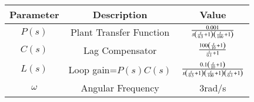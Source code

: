 \begin{tabular}{|c|c|c|}
\hline
    Parameter & Description & Value\\
    \hline
    $P(s)$ & Plant Transfer Function & $\frac{0.001}{s\left(\frac{s}{0.5}+1\right)\left(\frac{s}{100}+1\right)}$\\
    \hline
    $C(s)$ & Lag Compensator  & $\frac{100\left(\frac{s}{10}+1\right)}{\frac{s}{0.1}+1}$\\
    \hline
    $L(s)$ & Loop gain=$P(s) C(s)$  & $\frac{0.1\left(\frac{s}{10}+1\right)}{s\left(\frac{s}{0.5}+1\right)\left(\frac{s}{100}+1\right)\left(\frac{s}{0.1}+1\right)}$ \\
    \hline
    $\omega$ & Angular Frequency & 3rad/s \\
    \hline
\end{tabular}
